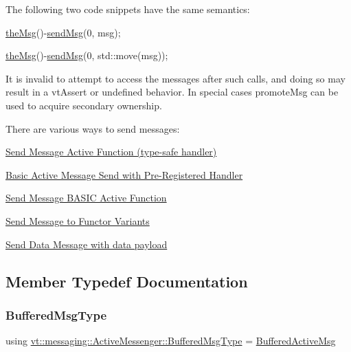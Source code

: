 The following two code snippets have the same semantics\+:


\begin{DoxyCode}
\hyperlink{namespacevt_aeafd31f866aeb4dc6fc2f6ee97136350}{theMsg}()-\hyperlink{group__preregister_ga0162a39473e7f9b490a79a7983d949ac}{sendMsg}(0, msg);
\end{DoxyCode}



\begin{DoxyCode}
\hyperlink{namespacevt_aeafd31f866aeb4dc6fc2f6ee97136350}{theMsg}()-\hyperlink{group__preregister_ga0162a39473e7f9b490a79a7983d949ac}{sendMsg}(0, std::move(msg));
\end{DoxyCode}


It is invalid to attempt to access the messages after such calls, and doing so may result in a vt\+Assert or undefined behavior. In special cases {\ttfamily promote\+Msg} can be used to acquire secondary ownership.

There are various ways to send messages\+:
\begin{DoxyItemize}
\item \hyperlink{group__typesafehan}{Send Message Active Function (type-\/safe handler)}
\item \hyperlink{group__preregister}{Basic Active Message Send with Pre-\/\+Registered Handler}
\item \hyperlink{group__basicsend}{Send Message B\+A\+S\+IC Active Function}
\item \hyperlink{group__functorsend}{Send Message to Functor Variants}
\item \hyperlink{group__sendpayload}{Send Data Message with data payload} 
\end{DoxyItemize}

\subsection{Member Typedef Documentation}
\mbox{\label{structvt_1_1messaging_1_1_active_messenger_a80a9cbda399d7bf035bfcecc761f4b02}} 
\subsubsection{\texorpdfstring{Buffered\+Msg\+Type}{BufferedMsgType}}
{\footnotesize\ttfamily using \hyperlink{structvt_1_1messaging_1_1_active_messenger_a80a9cbda399d7bf035bfcecc761f4b02}{vt\+::messaging\+::\+Active\+Messenger\+::\+Buffered\+Msg\+Type} =  \hyperlink{structvt_1_1messaging_1_1_buffered_active_msg}{Buffered\+Active\+Msg}}

